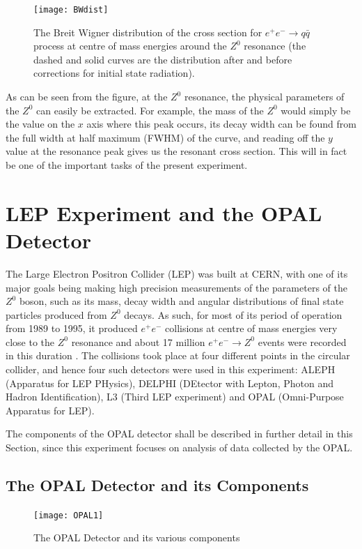 \begin{figure}[H]
\centering
\texttt{[image: BWdist]}
\caption[Breit Wigner distribution of the cross section for $e^{+}e^{-}\rightarrow q\bar{q}$ process]{The Breit Wigner distribution of the cross section for $e^{+}e^{-}\rightarrow q\bar{q}$ process at centre of mass energies around the $Z^{0}$ resonance (the dashed and solid curves are the distribution after and before corrections for initial state radiation). \cite{thomson_2013}}
\label{fig:BWdist}
\end{figure}
As can be seen from the figure, at the $Z^{0}$ resonance, the physical parameters of the $Z^{0}$ can easily be extracted. For example, the mass of the $Z^{0}$ would simply be the value on the $x$ axis where this peak occurs, its decay width can be found from the full width at half maximum (FWHM) of the curve, and reading off the $y$ value at the resonance peak gives us the resonant cross section. This will in fact be one of the important tasks of the present experiment.

\section{LEP Experiment and the OPAL Detector}
The Large Electron Positron Collider (LEP) was built at CERN, with one of its major goals being making high precision measurements of the parameters of the $Z^{0}$ boson, such as its mass, decay width and angular distributions of final state particles produced from $Z^{0}$ decays. As such, for most of its period of operation from 1989 to 1995, it produced $e^{+}e^{-}$ collisions at centre of mass energies very close to the $Z^{0}$ resonance and about 17 million $e^{+}e^{-}\rightarrow Z^{0}$ events were recorded in this duration \cite{thomson_2013}. The collisions took place at four different points in the circular collider, and hence four such detectors were used in this experiment: ALEPH (Apparatus for LEP PHysics), DELPHI (DEtector with Lepton, Photon and Hadron Identification), L3 (Third LEP experiment) and OPAL (Omni-Purpose Apparatus for LEP). 

The components of the OPAL detector shall be described in further detail in this Section, since this experiment focuses on analysis of data collected by the OPAL.

\subsection{The OPAL Detector and its Components}
\begin{figure}[H]
\centering
\texttt{[image: OPAL1]}
\caption[The OPAL Detector and its various components]{The OPAL Detector and its various components \cite{OPAL}}
\label{fig:OPAL}
\end{figure}

